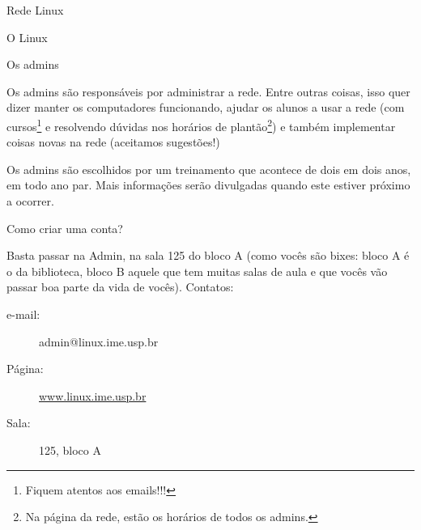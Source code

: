 \begin{subsecao}{Rede Linux}
\begin{subsubsecao}{O Linux}
\end{subsubsecao}

\begin{subsubsecao}{Os admins}

Os admins são responsáveis por administrar a rede. Entre outras coisas,
isso quer dizer manter os computadores funcionando, ajudar os alunos a
usar a rede (com cursos\footnote{ Fiquem atentos aos emails!!!} e resolvendo
dúvidas nos horários de plantão\footnote{ Na página da rede, estão os horários
de todos os admins.}) e também implementar coisas novas na rede (aceitamos
sugestões!)

Os admins são escolhidos por um treinamento que acontece de dois em dois anos,
em todo ano par. Mais informações serão divulgadas quando este estiver próximo
a ocorrer.

\end{subsubsecao}
\begin{subsubsecao}{Como criar uma conta?}

Basta passar na Admin, na sala 125 do bloco A (como vocês são bixes: bloco A é o da
biblioteca, bloco B aquele que tem muitas salas de aula e que vocês vão passar boa
parte da vida de vocês). Contatos:

\vspace{-1em}

\begin{description}
\item [e-mail:] admin@linux.ime.usp.br
\item [Página:] \url{www.linux.ime.usp.br}
\item [Sala:] 125, bloco A
\end{description}

\vspace{-.5em}

\end{subsubsecao}

\end{subsecao}
